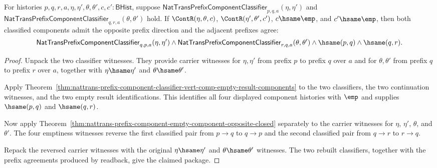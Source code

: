 \begin{theorem}
\label{thm:nattrans-prefix-component-classifier-empty-result-opposite-package}
For histories
$p,q,r,a,\eta,\eta',\theta,\theta',c,c':\mathsf{BHist}$, suppose
$\mathsf{NatTransPrefixComponentClassifier}_{p,q,a}(\eta,\eta')$ and
$\mathsf{NatTransPrefixComponentClassifier}_{q,r,a}(\theta,\theta')$ hold.
If $\ContR(\eta,\theta,c)$, $\ContR(\eta',\theta',c')$,
$c\hsame\emp$, and $c'\hsame\emp$, then both classified components admit the
opposite prefix direction and the adjacent prefixes agree:
$$
\mathsf{NatTransPrefixComponentClassifier}_{q,p,a}(\eta,\eta')\wedge
\mathsf{NatTransPrefixComponentClassifier}_{r,q,a}(\theta,\theta')\wedge
\hsame(p,q)\wedge\hsame(q,r).
$$
\end{theorem}
\begin{proof}
Unpack the two classifier witnesses. They provide carrier witnesses for
$\eta,\eta'$ from prefix $p$ to prefix $q$ over $a$ and for
$\theta,\theta'$ from prefix $q$ to prefix $r$ over $a$, together with
$\eta\hsame\eta'$ and $\theta\hsame\theta'$.

Apply
Theorem~\ref{thm:nattrans-prefix-component-classifier-vert-comp-empty-result-components}
to the two classifiers, the two continuation witnesses, and the two empty
result identifications. This identifies all four displayed component
histories with $\emp$ and supplies $\hsame(p,q)$ and $\hsame(q,r)$.

Now apply
Theorem~\ref{thm:nattrans-prefix-component-empty-component-opposite-closed}
separately to the carrier witnesses for $\eta$, $\eta'$, $\theta$, and
$\theta'$. The four emptiness witnesses reverse the first classified pair
from $p\to q$ to $q\to p$ and the second classified pair from $q\to r$ to
$r\to q$.

Repack the reversed carrier witnesses with the original
$\eta\hsame\eta'$ and $\theta\hsame\theta'$ witnesses. The two rebuilt
classifiers, together with the prefix agreements produced by readback, give
the claimed package.
\end{proof}

